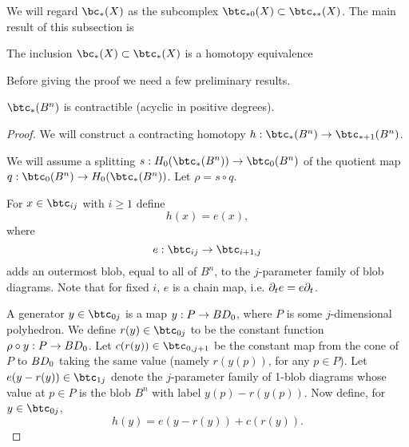 We will regard $\bc_*(X)$ as the subcomplex $\btc_{*0}(X) \sub \btc_{**}(X)$.
The main result of this subsection is

\begin{lemma} \label{lem:bc-btc}
The inclusion $\bc_*(X) \sub \btc_*(X)$ is a homotopy equivalence
\end{lemma}

Before giving the proof we need a few preliminary results.

\begin{lemma} \label{bt-contract}
$\btc_*(B^n)$ is contractible (acyclic in positive degrees).
\end{lemma}
\begin{proof}
We will construct a contracting homotopy $h: \btc_*(B^n)\to \btc_{*+1}(B^n)$.

We will assume a splitting $s:H_0(\btc_*(B^n))\to \btc_0(B^n)$
of the quotient map $q:\btc_0(B^n)\to H_0(\btc_*(B^n))$.
Let $\rho = s\circ q$.

For $x\in \btc_{ij}$ with $i\ge 1$ define
\[
	h(x) = e(x) ,
\]
where
\[
	e: \btc_{ij}\to\btc_{i+1,j}
\]
adds an outermost blob, equal to all of $B^n$, to the $j$-parameter family of blob diagrams.
Note that for fixed $i$, $e$ is a chain map, i.e. $\partial_t e = e \partial_t$.

A generator $y\in \btc_{0j}$ is a map $y:P\to BD_0$, where $P$ is some $j$-dimensional polyhedron.
We define $r(y)\in \btc_{0j}$ to be the constant function $\rho\circ y : P\to BD_0$. 
Let $c(r(y))\in \btc_{0,j+1}$ be the constant map from the cone of $P$ to $BD_0$ taking
the same value (namely $r(y(p))$, for any $p\in P$).
Let $e(y - r(y)) \in \btc_{1j}$ denote the $j$-parameter family of 1-blob diagrams
whose value at $p\in P$ is the blob $B^n$ with label $y(p) - r(y(p))$.
Now define, for $y\in \btc_{0j}$,
\[
	h(y) = e(y - r(y)) + c(r(y)) .
\]


\end{proof}
